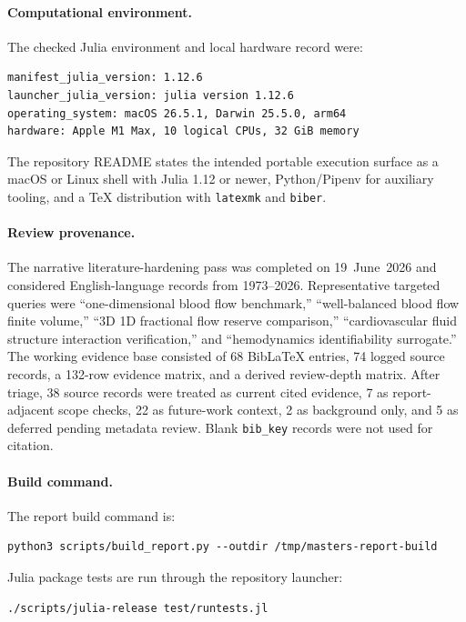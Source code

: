 \paragraph*{Computational environment.}
The checked Julia environment and local hardware record were:
\begin{lstlisting}[basicstyle=\ttfamily\footnotesize,breaklines=true]
manifest_julia_version: 1.12.6
launcher_julia_version: julia version 1.12.6
operating_system: macOS 26.5.1, Darwin 25.5.0, arm64
hardware: Apple M1 Max, 10 logical CPUs, 32 GiB memory
\end{lstlisting}
The repository README states the intended portable execution surface as a macOS
or Linux shell with Julia 1.12 or newer, Python/Pipenv for auxiliary tooling,
and a TeX distribution with \texttt{latexmk} and \texttt{biber}.

\paragraph*{Review provenance.}
The narrative literature-hardening pass was completed on 19~June~2026 and
considered English-language records from 1973--2026. Representative targeted
queries were ``one-dimensional blood flow benchmark,'' ``well-balanced blood
flow finite volume,'' ``3D 1D fractional flow reserve comparison,''
``cardiovascular fluid structure interaction verification,'' and
``hemodynamics identifiability surrogate.'' The working evidence base consisted
of 68 BibLaTeX entries, 74 logged source records, a 132-row evidence matrix, and
a derived review-depth matrix. After triage, 38 source records were treated as
current cited evidence, 7 as report-adjacent scope checks, 22 as future-work
context, 2 as background only, and 5 as deferred pending metadata review. Blank
\texttt{bib\_key} records were not used for citation.

\paragraph*{Build command.}
The report build command is:
\begin{lstlisting}[basicstyle=\ttfamily\footnotesize,breaklines=true]
python3 scripts/build_report.py --outdir /tmp/masters-report-build
\end{lstlisting}
Julia package tests are run through the repository launcher:
\begin{lstlisting}[basicstyle=\ttfamily\footnotesize,breaklines=true]
./scripts/julia-release test/runtests.jl
\end{lstlisting}

